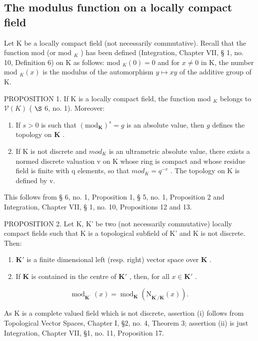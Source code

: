 \subsection{The modulus function on a locally compact field}

Let K be a locally compact field (not necessarily commutative). Recall that the function mod (or mod \(_K\) ) has been defined (Integration, Chapter VII, § 1, no. 10, Definition 6) on K as follows: mod \(_K(0) = 0\) and for \(x \neq 0\) in K, the number mod \(_K(x)\) is the modulus of the automorphism \(y \mapsto xy\) of the additive group of K.

PROPOSITION 1. If K is a locally compact field, the function mod \(_{K}\) belongs to \(\mathcal{V}(K)\) ( \(\S\) 6, no. 1). Moreover:

\begin{enumerate}
\def\labelenumi{(\roman{enumi})}
\item
  If \(s > 0\) is such that \((\mathrm{mod}_{\mathbf{K}})^s = g\) is an absolute value, then \(g\) defines the topology on \(\mathbf{K}\) .
\item
  If K is not discrete and \(mod_{K}\) is an ultrametric absolute value, there exists a normed discrete valuation v on K whose ring is compact and whose residue field is finite with q elements, so that \(mod_{K} = q^{-v}\) . The topology on K is defined by v.
\end{enumerate}

This follows from § 6, no. 1, Proposition 1, § 5, no. 1, Proposition 2 and Integration, Chapter VII, § 1, no. 10, Propositions 12 and 13.

PROPOSITION 2. Let K, K' be two (not necessarily commutative) locally compact fields such that K is a topological subfield of K' and K is not discrete. Then:

\begin{enumerate}
\def\labelenumi{(\roman{enumi})}
\item
  \(\mathbf{K}'\) is a finite dimensional left (resp. right) vector space over \(\mathbf{K}\) .
\item
  If \(\mathbf{K}\) is contained in the centre of \(\mathbf{K}'\) , then, for all \(x \in \mathbf{K}'\) .
\end{enumerate}

\[
\operatorname{mod} _ {\mathbf {K} ^ {\prime}} (x) = \operatorname{mod} _ {\mathbf {K}} (\mathrm{N} _ {\mathbf {K} ^ {\prime} / \mathbf {K}} (x)).\tag{1}
\]

As K is a complete valued field which is not discrete, assertion (i) follows from Topological Vector Spaces, Chapter I, §2, no. 4, Theorem 3; assertion (ii) is just Integration, Chapter VII, §1, no. 11, Proposition 17.

